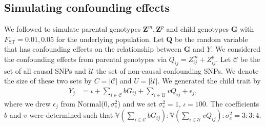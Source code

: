 \documentclass[12pt]{extarticle}
\newcommand{\intercept}{\iota}
\newcommand{\V}{\mathbb{V}}
\newcommand{\cC}{\mathcal{C}}
\newcommand{\cU}{\mathcal{U}}
\begin{document}
{{\subsection{Simulating confounding effects} \label{app:simulate_confounding}

We followed  to simulate parental genotypes $\boldsymbol{Z}^m,\boldsymbol{Z}^p$ and child genotypes $\boldsymbol{G}$ with $F_{\text{ST}}=0.01,0.05$ for the underlying population. Let $\boldsymbol{Q}$ be the random variable that has confounding effects on the relationship between $\boldsymbol{G}$ and $Y$. We considered the confounding effects from parental genotypes via $Q_{ij}=Z^m_{ij}+Z^p_{ij}$. Let $\cC$ be the set of all causal SNPs and $\cU$ the set of non-causal confounding SNPs. We denote the size of these two sets by $C = |\cC|$ and $U = |\cU|$.  We generated the child trait by 
\begin{align*}
Y_j &= \intercept + \sum_{i\in \cC}bG_{ij}+ \sum_{i \in \cU}v Q_{ij} + \epsilon_j,
\end{align*} 
where we drew $\epsilon_j$ from Normal($0,\sigma^2_e$) and we set $\sigma^2_e=1$, $\intercept=100$. The coefficients $b$ and $v$ were determined such that $\V\left(\sum_{i\in \cC}bG_{ij}\right):\V\left(\sum_{i\in \cU}vQ_{ij}\right):\sigma^2_e=3:3:4$. 

}}
\end{document}
